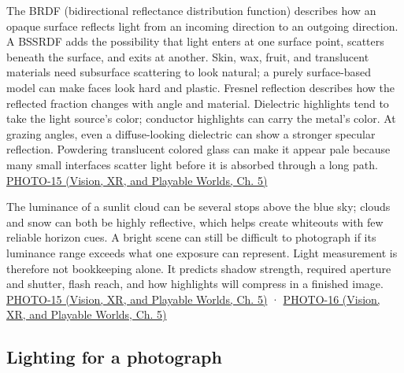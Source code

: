 The BRDF (bidirectional reflectance distribution function) describes how an opaque surface reflects light from an incoming direction to an outgoing direction. A BSSRDF adds the possibility that light enters at one surface point, scatters beneath the surface, and exits at another. Skin, wax, fruit, and translucent materials need subsurface scattering to look natural; a purely surface-based model can make faces look hard and plastic. Fresnel reflection describes how the reflected fraction changes with angle and material. Dielectric highlights tend to take the light source's color; conductor highlights can carry the metal's color. At grazing angles, even a diffuse-looking dielectric can show a stronger specular reflection. Powdering translucent colored glass can make it appear pale because many small interfaces scatter light before it is absorbed through a long path. \href{../07-Vision-XR-and-Playable-Worlds/main.pdf\#nameddest=04-visual-computing-ii-ch036-photo-15---photography-session-15}{PHOTO-15 (Vision, XR, and Playable Worlds, Ch. 5)}

The luminance of a sunlit cloud can be several stops above the blue sky; clouds and snow can both be highly reflective, which helps create whiteouts with few reliable horizon cues. A bright scene can still be difficult to photograph if its luminance range exceeds what one exposure can represent. Light measurement is therefore not bookkeeping alone. It predicts shadow strength, required aperture and shutter, flash reach, and how highlights will compress in a finished image. \href{../07-Vision-XR-and-Playable-Worlds/main.pdf\#nameddest=04-visual-computing-ii-ch036-photo-15---photography-session-15}{PHOTO-15 (Vision, XR, and Playable Worlds, Ch. 5)} · \href{../07-Vision-XR-and-Playable-Worlds/main.pdf\#nameddest=04-visual-computing-ii-ch036-photo-16---photography-session-16}{PHOTO-16 (Vision, XR, and Playable Worlds, Ch. 5)}

\subsection{Lighting for a photograph}\label{03-visual-computing-i-ch004-lighting-for-a-photograph}

\hypertarget{03-visual-computing-i-ch004-lighting-for-a-photograph}{}

